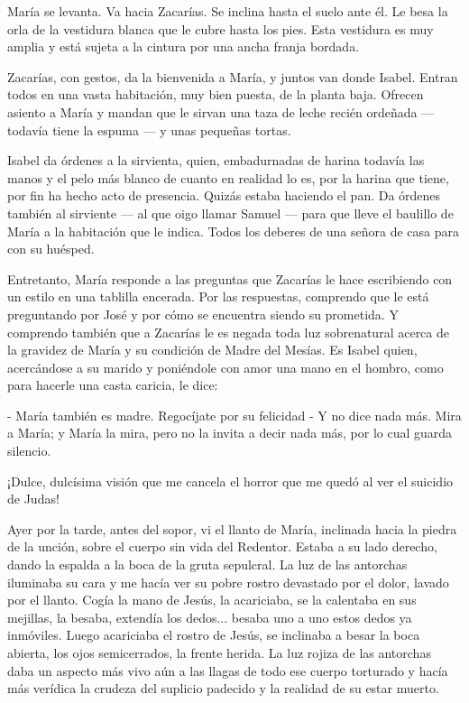 \documentclass[12pt]{book} %
\begin{document}
María se levanta. Va hacia Zacarías. Se inclina hasta el suelo ante él. Le besa la orla de la vestidura blanca que le cubre hasta los pies. Esta vestidura es muy amplia y está sujeta a la cintura por una ancha franja bordada. 

Zacarías, con gestos, da la bienvenida a María, y juntos van donde Isabel. Entran todos en una vasta habitación, muy bien puesta, de la planta baja. Ofrecen asiento a María y mandan que le sirvan una taza de leche recién ordeñada — todavía tiene la espuma — y unas pequeñas tortas. 

Isabel da órdenes a la sirvienta, quien, embadurnadas de harina todavía las manos y el pelo más blanco de cuanto en realidad lo es, por la harina que tiene, por fin ha hecho acto de presencia. Quizás estaba haciendo el pan. Da órdenes también al sirviente — al que oigo llamar Samuel — para que lleve el baulillo de María a la habitación que le indica. Todos los deberes de una señora de casa para con su huésped. 

Entretanto, María responde a las preguntas que Zacarías le hace escribiendo con un estilo en una tablilla encerada. Por las respuestas, comprendo que le está preguntando por José y por cómo se encuentra siendo su prometida. Y comprendo también que a Zacarías le es negada toda luz sobrenatural acerca de la gravidez de María y su condición de Madre del Mesías. Es Isabel quien, acercándose a su marido y poniéndole con amor una mano en el hombro, como para hacerle una casta caricia, le dice: 

- María también es madre. Regocíjate por su felicidad - Y no dice nada más. Mira a María; y María la mira, pero no la invita a decir nada más, por lo cual guarda silencio. 

¡Dulce, dulcísima visión que me cancela el horror que me quedó al ver el suicidio de Judas! 

Ayer por la tarde, antes del sopor, vi el llanto de María, inclinada hacia la piedra de la unción, sobre el cuerpo sin vida del Redentor. Estaba a su lado derecho, dando la espalda a la boca de la gruta sepulcral. La luz de las antorchas iluminaba su cara y me hacía ver su pobre rostro devastado por el dolor, lavado por el llanto. Cogía la mano de Jesús, la acariciaba, se la calentaba en sus mejillas, la besaba, extendía los dedos... besaba uno a uno estos dedos ya inmóviles. Luego acariciaba el rostro de Jesús, se inclinaba a besar la boca abierta, los ojos semicerrados, la frente herida. La luz rojiza de las antorchas daba un aspecto más vivo aún a las llagas de todo ese cuerpo torturado y hacía más verídica la crudeza del suplicio padecido y la realidad de su estar muerto. 
\end{document}
